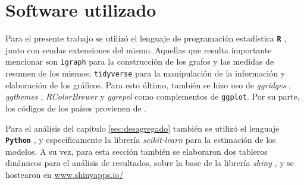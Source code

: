 \documentclass[class=article, crop=false]{standalone}
\begin{document}
\section{Software utilizado}

Para el presente trabajo se utilizó el lenguaje de programación estadística \texttt{\textbf{R}} \citep{RCoreTeam2017}, junto con sendas extensiones del mismo. Aquellas que resulta importante mencionar son \texttt{igraph}\citep{Csardi2006} para la construcción de los grafos y las medidas de resumen de los mismos; \texttt{tidyverse}\citep{Wickham2017} para la manipulación de la información y elaboración de los gráficos. Para esto último, también se hizo uso de \textit{ggridges} \citep{Wilke2017}, \textit{ggthemes} \citep{Arnold2017}, \textit{RColorBrewer} \citep{Neuwirth2014} y \textit{ggrepel} \citep{Slowikowski2017} como complementos de \texttt{ggplot}. Por su parte, los códigos de los países provienen de \citep{Arel-Bundock2017}.

Para el análisis del capítulo \ref{sec:desagregado} también se utilizó el lenguaje \texttt{\textbf{Python}} \citep{CS-R9526}, y específicamente la librería \textit{scikit-learn} \citep{scikit-learn} para la estimación de los modelos.
A su vez, para esta sección también se elaboraron dos tableros dinámicos para el análisis de resultados, sobre la base de la librería \textit{shiny} \citep{Chang2018}, y se hostearon en \url{www.shinyapps.io/} \citep{Allaire2019}


%
%
%
\end{document}
